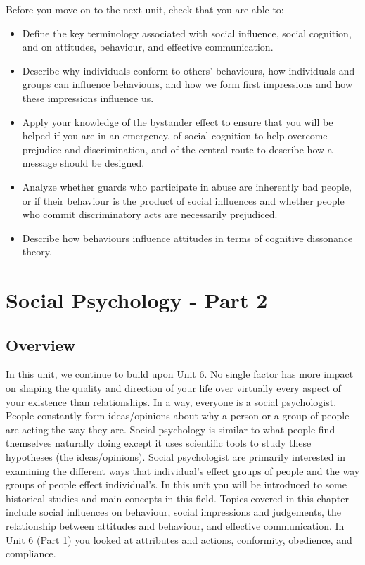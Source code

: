 \documentclass[
]{book}
\begin{document}
\begin{progress}
Before you move on to the next unit, check that you are able to:

\begin{itemize}
\item
  Define the key terminology associated with social influence, social cognition, and on attitudes, behaviour, and effective communication.
\item
  Describe why individuals conform to others' behaviours, how individuals and groups can influence behaviours, and how we form first impressions and how these impressions influence us.
\item
  Apply your knowledge of the bystander effect to ensure that you will be helped if you are in an emergency, of social cognition to help overcome prejudice and discrimination, and of the central route to describe how a message should be designed.
\item
  Analyze whether guards who participate in abuse are inherently bad people, or if their behaviour is the product of social influences and whether people who commit discriminatory acts are necessarily prejudiced.
\item
  Describe how behaviours influence attitudes in terms of cognitive dissonance theory.
\end{itemize}
\end{progress}

\hypertarget{social-psychology---part-2}{%
\chapter{Social Psychology - Part 2}\label{social-psychology---part-2}}

\hypertarget{overview-5}{%
\section*{Overview}\label{overview-5}}

In this unit, we continue to build upon Unit 6. No single factor has more impact on shaping the quality and direction of your life over virtually every aspect of your existence than relationships. In a way, everyone is a social psychologist. People constantly form ideas/opinions about why a person or a group of people are acting the way they are. Social psychology is similar to what people find themselves naturally doing except it uses scientific tools to study these hypotheses (the ideas/opinions). Social psychologist are primarily interested in examining the different ways that individual's effect groups of people and the way groups of people effect individual's. In this unit you will be introduced to some historical studies and main concepts in this field. Topics covered in this chapter include social influences on behaviour, social impressions and judgements, the relationship between attitudes and behaviour, and effective communication. In Unit 6 (Part 1) you looked at attributes and actions, conformity, obedience, and compliance.
\end{document}
